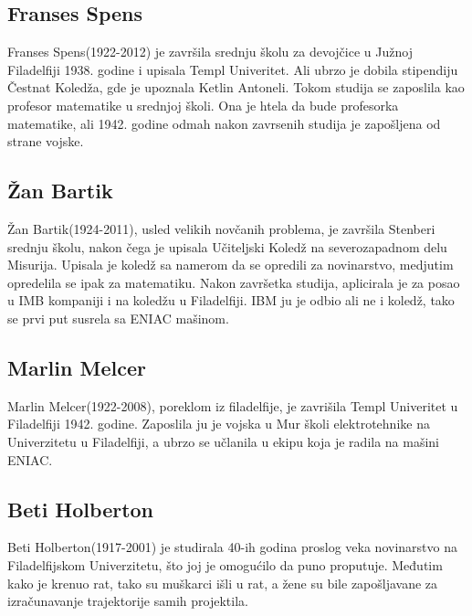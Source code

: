 \documentclass[a4paper,12pt]{article}
\begin{document}
\subsection{Franses Spens}
\begin{flushleft}

Franses Spens(1922-2012) je završila srednju školu za devojčice u Južnoj Filadelfiji 1938. godine i upisala Templ Univeritet. Ali ubrzo je dobila stipendiju Čestnat Koledža, gde je upoznala Ketlin Antoneli. Tokom studija se zaposlila kao profesor matematike u srednjoj školi. Ona je htela da bude profesorka matematike, ali 1942. godine odmah nakon zavrsenih studija je zapošljena od strane vojske.

\end{flushleft}

\subsection{Žan Bartik}
\begin{flushleft}

Žan Bartik(1924-2011), usled velikih novčanih problema, je završila Stenberi srednju školu, nakon čega je upisala Učiteljski Koledž na severozapadnom delu Misurija. Upisala je koledž sa namerom da se opredili za novinarstvo, medjutim opredelila se ipak za matematiku. Nakon završetka studija, aplicirala je za posao u IMB kompaniji i na koledžu u Filadelfiji. IBM ju je odbio ali ne i koledž, tako se prvi put susrela sa ENIAC mašinom. 

\end{flushleft}

\subsection{Marlin Melcer}
\begin{flushleft}

Marlin Melcer(1922-2008), poreklom iz filadelfije, je zavrišila Templ Univeritet u Filadelfiji 1942. godine. Zaposlila ju je vojska u Mur školi elektrotehnike na Univerzitetu u Filadelfiji, a ubrzo se učlanila u ekipu koja je radila na mašini ENIAC. 

\end{flushleft}

\subsection{Beti Holberton}
\begin{flushleft}

Beti Holberton(1917-2001) je studirala 40-ih godina proslog veka novinarstvo na Filadelfijskom Univerzitetu, što joj je omogućilo da puno proputuje. Međutim kako je krenuo rat, tako su muškarci išli u rat, a žene su bile zapošljavane za izračunavanje trajektorije samih projektila.

\end{flushleft}
\end{document}
